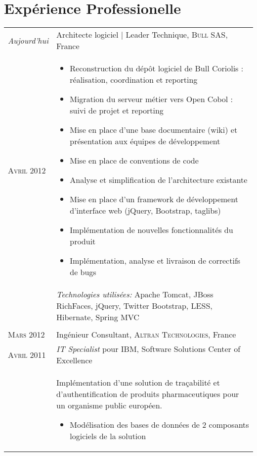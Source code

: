 \section{\texorpdfstring{\color{Blue}Expérience Professionelle}{Expérience Professionelle}}
\begin{longtable}{R{2.5cm}|p{14.8cm}}
  \emph{Aujourd'hui} & Architecte logiciel | Leader Technique, \textsc{Bull SAS}, France\\
  \textsc{Avril 2012} & 
  \vspace{-1em}
  \footnotesize{
    \begin{itemize}
      \item Reconstruction du dépôt logiciel de Bull Coriolis : réalisation, coordination et reporting
      \item Migration du serveur métier vers Open Cobol : suivi de projet et reporting
      \item Mise en place d'une base documentaire (wiki) et présentation aux 
      équipes de développement
      \item Mise en place de conventions de code
      \item Analyse et simplification de l'architecture existante
      \item Mise en place d'un framework de développement d'interface web (jQuery, Bootstrap, taglibs)
      \item Implémentation de nouvelles fonctionnalités du produit
      \item Implémentation, analyse et livraison de correctifs de bugs
    \end{itemize}
    \vspace{-1em}
  }\\&
 	\footnotesize{\emph{Technologies utilisées:} Apache Tomcat, JBoss RichFaces, jQuery, Twitter Bootstrap, LESS, Hibernate, Spring MVC }\\
  \\
 	\textsc{Mars 2012} & Ingénieur Consultant, \textsc{Altran Technologies}, France\\
 	\textsc{Avril 2011}& \emph{IT Specialist} pour IBM, Software Solutions Center of Excellence\\&
 	\footnotesize{
 		Implémentation d'une solution de traçabilité et d'authentification
 	 	de produits pharmaceutiques pour un organisme public européen.
 		\begin{itemize}
			\item Modélisation des bases de données de 2 composants logiciels de la solution

\end{itemize}}
\end{longtable}
